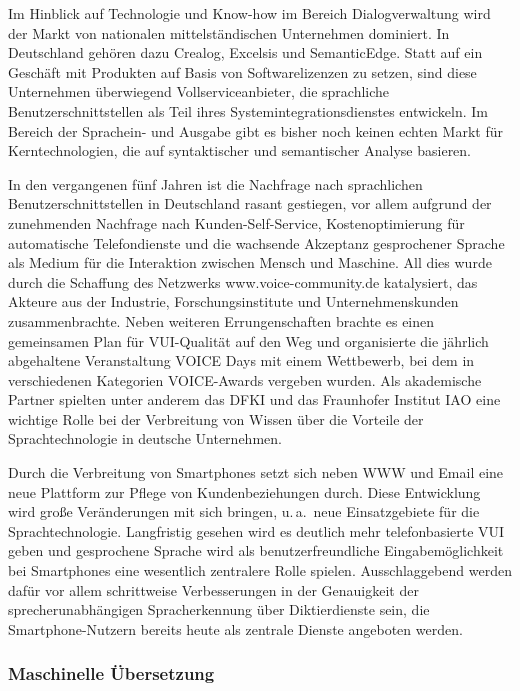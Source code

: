 \begin{multicols}{2}
Im Hinblick auf Technologie und Know-how im Bereich Dialogverwaltung wird der Markt von nationalen mittelständischen Unternehmen dominiert.
In Deutschland gehören dazu Crealog, Excelsis und SemanticEdge. Statt auf ein Geschäft mit Produkten auf Basis von Softwarelizenzen zu setzen, sind diese Unternehmen überwiegend Vollserviceanbieter, die sprachliche Benutzerschnittstellen als Teil ihres Systemintegrationsdienstes entwickeln. Im Bereich der Sprachein- und Ausgabe gibt es bisher noch keinen echten Markt für Kerntechnologien, die auf syntaktischer und semantischer Analyse basieren.

In den vergangenen fünf Jahren ist die Nachfrage nach sprachlichen Benutzerschnittstellen in Deutschland rasant gestiegen, vor allem aufgrund der zunehmenden Nachfrage nach Kunden-Self-Service, Kostenoptimierung für automatische Telefondienste und die wachsende Akzeptanz gesprochener Sprache als Medium für die Interaktion zwischen Mensch und Maschine. All dies wurde durch die Schaffung des Netzwerks www.voice-community.de katalysiert, das Akteure aus der Industrie, Forschungsinstitute und Unternehmenskunden zusammenbrachte. Neben weiteren Errungenschaften brachte es einen gemeinsamen Plan für VUI-Qualität auf den Weg und organisierte die jährlich abgehaltene Veranstaltung VOICE Days mit einem Wettbewerb, bei dem in verschiedenen Kategorien VOICE-Awards vergeben wurden. Als akademische Partner spielten unter anderem das DFKI und das Fraunhofer Institut IAO eine wichtige Rolle bei der Verbreitung von Wissen über die Vorteile der Sprachtechnologie in deutsche Unternehmen.

Durch die Verbreitung von Smartphones setzt sich neben WWW und Email eine neue Plattform zur Pflege von Kundenbeziehungen durch. Diese Entwicklung wird große Veränderungen mit sich bringen, u.\,a.~neue Einsatzgebiete für die Sprachtechnologie. 
Langfristig gesehen wird es deutlich mehr telefonbasierte VUI geben und gesprochene Sprache wird als benutzerfreundliche Eingabemöglichkeit bei Smartphones eine wesentlich zentralere Rolle spielen. Ausschlaggebend werden dafür vor allem schrittweise Verbesserungen in der Genauigkeit der sprecherunabhängigen Spracherkennung über Diktierdienste sein, die Smartphone-Nutzern bereits heute als zentrale Dienste angeboten werden.

\subsubsection{Maschinelle Übersetzung}


\end{multicols}
